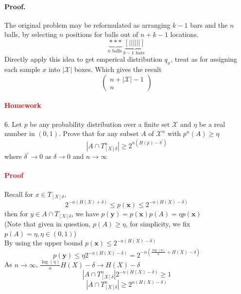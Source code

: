 \documentclass[8pt]{article}
\begin{document}
\paragraph{Proof.}
The original problem may be reformulated as arranging $k-1$ bars and the $n$ balls, by selecting $n$ positions for balls out of $n+k-1$ locations.
$$
\underbrace{* * *}_{n \text { balls }}  \underbrace{[||||||]}_{k-1 \text { bars }}
$$
Directly apply this idea to get emperical distribution $q_x$, treat as for assigning each sample $x$ into $|\mathcal{X}|$ boxes. Which gives the result
$$\left(\begin{array}{c}n+|\mathcal{X}|-1 \\ n\end{array}\right)$$

\paragraph{\textcolor{red}{Homework}}
6. Let $p$ be any probability distribution over a finite set $\mathcal{X}$ and $\eta$ be a real number in $(0,1) .$ Prove that for any subset $A$ of $\mathcal{X}^{n}$ with $p^{n}(A) \geq \eta$
$$
\left|A \cap T_{[X] \delta}^{n}\right| \geq 2^{n\left(H(p)-\delta^{\prime}\right)}
$$
where $\delta^{\prime} \rightarrow 0$ as $\delta \rightarrow 0$ and $n \rightarrow \infty$
\paragraph{\textcolor{red}{Proof}}
%

Recall for $x \in T_{[X] \delta}$,
$$
2^{-n(H(X)+\delta)} \leq p(\mathbf{x}) \leq 2^{-n(H(X)-\delta)}
$$
then for $y \in A \cap T_{[X] \delta}$, we have $p(\mathbf{y}) = p(\mathbf{x})p(A) = \eta p(\mathbf{x})$ \\ (Note that given in question, $p(A) \geq \eta$, for simplicity, we fix $p(A) = \eta, \eta \in (0, 1)$)\\
By using the upper bound $p(\mathbf{x}) \leq 2^{-n(H(X)-\delta)}$
$$
p(\mathbf{y}) \leq \eta 2^{-n(H(X)-\delta)} = 2^{-n( \frac{\log(\eta)}{n} + H(X)-\delta)}
$$
As $n \rightarrow \infty$, $\frac{\log(\eta)}{n}  H(X)-\delta \rightarrow H(X)-\delta$
$$
\left|A \cap T_{[X] \delta}^{n}\right| 2^{-n(H(X)-\delta)} \geq 1
$$
$$
\left|A \cap T_{[X] \delta}^{n}\right| \geq 2^{n(H(X)-\delta)}
$$
\end{document}
